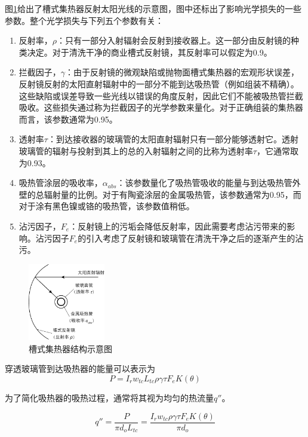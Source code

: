 图\ref{fig:ParabolicTrough}给出了槽式集热器反射太阳光线的示意图，图中还标出了影响光学损失的一些参数。整个光学损失与下列五个参数有关：

\begin{enumerate}[label=(\arabic*)]
  \item 反射率，$\rho$：只有一部分入射辐射会反射到接收器上。这一部分由反射镜的种类决定。对于清洗干净的商业槽式反射镜，其反射率可以假定为0.9。
  \item 拦截因子，$\gamma$：由于反射镜的微观缺陷或抛物面槽式集热器的宏观形状误差，反射镜反射的太阳直射辐射中的一部分不能到达吸热管（例如组装不精确）。这些缺陷或误差导致一些光线以错误的角度反射，因此它们不能被吸热管拦截吸收。这些损失通过称为拦截因子的光学参数来量化。对于正确组装的集热器而言，该参数通常为0.95。
  \item 透射率$\tau$：到达接收器的玻璃管的太阳直射辐射只有一部分能够透射它。透射玻璃管的辐射与投射到其上的总的入射辐射之间的比称为透射率$\tau$，它通常取为0.93。
  \item 吸热管涂层的吸收率，$\alpha_{abs}$：该参数量化了吸热管吸收的能量与到达吸热管外壁的总辐射量的比例。对于有陶瓷涂层的金属吸热管，该参数通常为0.95，而对于涂有黑色镍或铬的吸热管，该参数值稍低。
  \item 沾污因子，$F_e$：反射镜上的污垢会降低反射率，因此需要考虑沾污带来的影响。沾污因子$F_e$的引入考虑了反射镜和玻璃管在清洗干净之后的逐渐产生的沾污。
\end{enumerate}

\begin{figure}[!ht]
\centering
\includegraphics[width=0.3\textwidth]{fig/ParametersOfParabolicDish.pdf}
\caption{槽式集热器结构示意图}\label{fig:ParabolicTrough}
\end{figure}

穿透玻璃管到达吸热器的能量可以表示为
\begin{equation}
  P = I_r w_{tc} L_{tc} \rho \gamma \tau F_e K(\theta)
\end{equation}

为了简化吸热器的吸热过程，通常将其视为均匀的热流量$q''$。

\begin{equation}
  q''= \frac{P}{\pi d_o L_{tc}} = \frac{I_r w_{tc} \rho \gamma \tau F_e K(\theta)}{\pi d_o}
\end{equation}

